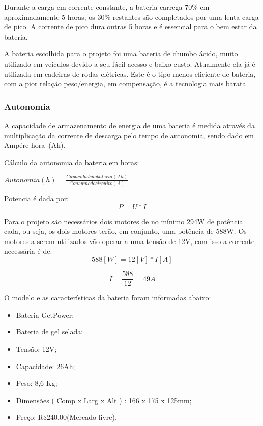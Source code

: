 Durante a carga em corrente constante, a bateria carrega 70\% em aproximadamente 5 horas; os 30\% restantes são completados por uma lenta carga de pico. A corrente de pico dura outras 5 horas e é essencial para o bem estar da bateria.

A bateria escolhida para o projeto foi uma bateria de chumbo ácido, muito utilizado em veículos devido a seu fácil acesso e baixo custo. Atualmente ela já é utilizada em cadeiras de rodas elétricas. Este é o tipo menos eficiente de bateria, com a pior relação peso/energia, em compensação, é a tecnologia mais barata.

\subsubsection{Autonomia}
A capacidade de armazenamento de energia de uma bateria é medida através da multiplicação da corrente de descarga pelo tempo de autonomia, sendo dado em Ampére-hora~(Ah).

Cálculo da autonomia da bateria em horas:

$Autonomia(h) = \frac{Capacidade da bateria(Ah)}{Consumo do circuito(A)}$

Potencia é dada por:
\begin{equation}
 P=U*I
\end{equation}

Para o projeto são necessários dois motores de no mínimo 294W de potência cada, ou seja, os dois motores terão, em conjunto, uma potência de 588W. Os motores a serem utilizados vão operar a uma tensão de 12V, com isso a corrente necessária é de:
\begin{equation}
588 [W] = 12 [V] * I [A]
\end{equation}

\begin{equation}
I = \frac{588}{12} = 49A
\end{equation}

O modelo e as características da bateria foram informadas abaixo:
\begin{itemize}
 \item Bateria GetPower;
 \item Bateria de gel selada;
 \item Tensão: 12V;
 \item Capacidade: 26Ah;
 \item Peso: 8,6 Kg;
 \item Dimensões ( Comp x Larg x Alt ) : 166 x 175 x 125mm;
 \item Preço: R\$240,00(Mercado livre).
\end{itemize}

